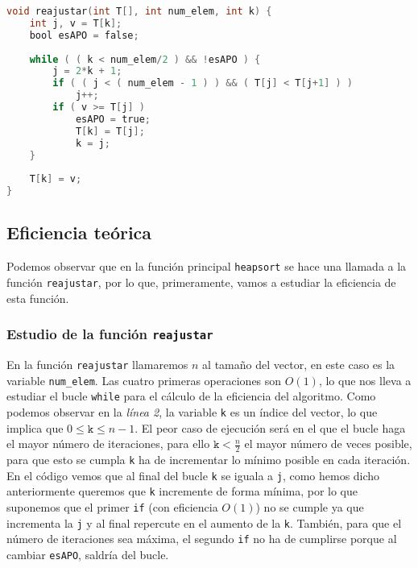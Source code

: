 \documentclass[10pt, a4paper]{article}
\theoremstyle{theorem-style}
\theoremstyle{theorem-style}
\theoremstyle{definition-style}
\theoremstyle{remark-style}
\theoremstyle{example-style}
\theoremstyle{definition-style}
\theoremstyle{remark-style}
\begin{document}
\begin{lstlisting}[language=C]
void reajustar(int T[], int num_elem, int k) {
	int j, v = T[k];
	bool esAPO = false;
	
	while ( ( k < num_elem/2 ) && !esAPO ) {
		j = 2*k + 1;
		if ( ( j < ( num_elem - 1 ) ) && ( T[j] < T[j+1] ) )
			j++;
		if ( v >= T[j] )
			esAPO = true;
			T[k] = T[j];
			k = j;
	}
	
	T[k] = v;
}
\end{lstlisting}

\subsection{Eficiencia teórica}

Podemos observar que en la función principal \texttt{heapsort} se hace una llamada a la función \texttt{reajustar}, por lo que, primeramente, vamos a estudiar la eficiencia de esta función.

\subsubsection*{Estudio de la función \texttt{reajustar}}

En la función \texttt{reajustar} llamaremos $n$ al tamaño del vector, en este caso es la variable \texttt{num\_elem}. Las cuatro primeras operaciones son $O(1)$, lo que nos lleva a estudiar el bucle \texttt{while} para el cálculo de la eficiencia del algoritmo. Como podemos observar en la \emph{línea 2}, la variable \texttt{k} es un índice del vector, lo que implica que $0 \leq \texttt{k} \leq n-1$. El peor caso de ejecución será en el que el bucle haga el mayor número de iteraciones, para ello $\texttt{k} < \frac{n}{2}$ el mayor número de veces posible, para que esto se cumpla \texttt{k} ha de incrementar lo mínimo posible en cada iteración. En el código vemos que al final del bucle \texttt{k} se iguala a \texttt{j}, como hemos dicho anteriormente queremos que \texttt{k} incremente de forma mínima, por lo que suponemos que el primer \texttt{if} (con eficiencia $O(1)$) no se cumple ya que incrementa la \texttt{j} y al final repercute en el aumento de la \texttt{k}. También, para que el número de iteraciones sea máxima, el segundo \texttt{if} no ha de cumplirse porque al cambiar \texttt{esAPO}, saldría del bucle.
\end{document}

